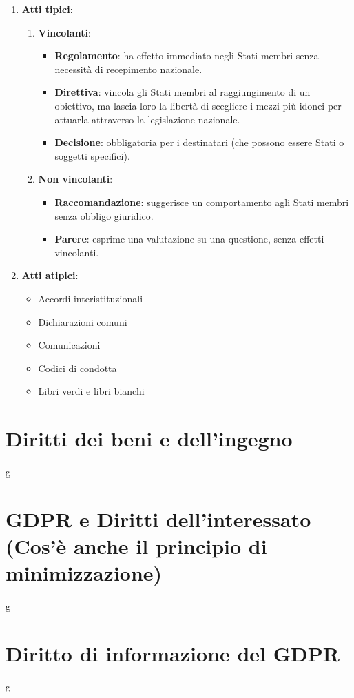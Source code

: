 \documentclass[10pt,oneside,a4paper]{article}
\begin{document}
	\begin{enumerate}
		\item \textbf{Atti tipici}:
		\begin{enumerate}
			\item \textbf{Vincolanti}:
			\begin{itemize}
				\item \textbf{Regolamento}: ha effetto immediato negli Stati membri senza necessità di recepimento nazionale.
				\item \textbf{Direttiva}: vincola gli Stati membri al raggiungimento di un obiettivo, ma lascia loro la libertà di scegliere i mezzi più idonei per attuarla attraverso la legislazione nazionale.
				\item \textbf{Decisione}: obbligatoria per i destinatari (che possono essere Stati o soggetti specifici).
			\end{itemize}
			\item \textbf{Non vincolanti}:
			\begin{itemize}
				\item \textbf{Raccomandazione}: suggerisce un comportamento agli Stati membri senza obbligo giuridico.
				\item \textbf{Parere}: esprime una valutazione su una questione, senza effetti vincolanti.
			\end{itemize}
		\end{enumerate}
		\item \textbf{Atti atipici}:  
		\begin{itemize}
			\item Accordi interistituzionali
			\item Dichiarazioni comuni
			\item Comunicazioni
			\item Codici di condotta
			\item Libri verdi e libri bianchi
		\end{itemize}
	\end{enumerate}
	\section{Diritti dei beni e dell'ingegno}
	g
	\section{GDPR e Diritti dell'interessato (Cos'è anche il principio di minimizzazione)}
	g
	\section{Diritto di informazione del GDPR}
	g
\end{document}
